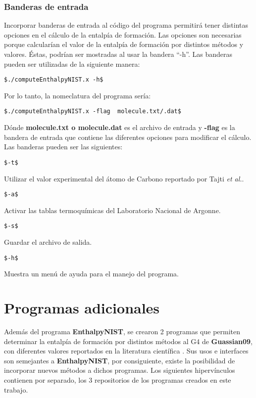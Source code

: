 \subsection*{Banderas de entrada}
 Incorporar banderas de entrada al código del programa permitirá tener distintas opciones en el cálculo de la entalpía de formación.  Las opciones son necesarias porque calcularían el valor de la entalpía de formación por distintos métodos y valores. Éstas, podrían ser mostradas al usar la bandera “-h”. Las banderas pueden ser utilizadas de la siguiente manera:
\begin{lstlisting}
$./computeEnthalpyNIST.x -h$
\end{lstlisting}
Por lo tanto, la nomeclatura del programa sería:
\begin{lstlisting}
$./computeEnthalpyNIST.x -flag  molecule.txt/.dat$
\end{lstlisting}
Dónde \textbf{molecule.txt o molecule.dat} es el archivo de entrada y \textbf{-flag} es la bandera de entrada que contiene las diferentes opciones para modificar el cálculo. Las banderas pueden ser las siguientes:
\begin{lstlisting}
$-t$
\end{lstlisting}
Utilizar el valor experimental del átomo de Carbono reportado por Tajti \textit{et al.}\cite{Tajti2004}.
\begin{lstlisting}
$-a$
\end{lstlisting}
Activar las tablas termoquímicas del Laboratorio Nacional de Argonne.
\begin{lstlisting}
$-s$ 
\end{lstlisting}
Guardar el archivo de salida. 
\begin{lstlisting}
$-h$ 
\end{lstlisting}
Muestra un menú de ayuda para el manejo del programa. 

\chapter{Programas adicionales}

Además del programa \textbf{EnthalpyNIST}, se crearon 2 programas que permiten determinar la entalpía de formación por distintos métodos al G4 de \textbf{Guassian09}, con diferentes valores reportados en la literatura científica \cite{Simmie2015,NIST1998,Tajti2004}. Sus usos e interfaces son semejantes a \textbf{EnthalpyNIST}, por consiguiente, existe la posibilidad de incorporar nuevos métodos a dichos programas. Los siguientes hipervínculos contienen por separado, los 3 repositorios de los programas creados en este trabajo.\\

